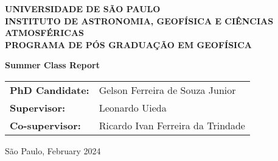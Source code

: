 \begin{titlepage}
   \begin{center}
        \vspace*{0.5cm}
        \small{\textbf{UNIVERSIDADE DE SÃO PAULO\\INSTITUTO DE ASTRONOMIA, GEOFÍSICA E CIÊNCIAS ATMOSFÉRICAS\\PROGRAMA DE PÓS GRADUAÇÃO EM GEOFÍSICA}}
        
        \vfill
        \large{\textbf{Summer Class Report}}
            
        \vfill
        \normalsize{
     
        \begin{center}
        \begin{tabular}{l l}
            \textbf{PhD Candidate:} & Gelson Ferreira de Souza Junior\\
            \textbf{Supervisor:}  & Leonardo Uieda\\
            \textbf{Co-supervisor:} &  Ricardo Ivan Ferreira da Trindade\\
        \end{tabular}
        \end{center}

        
        }
        
        \vfill
        \normalsize{São Paulo, February 2024}
            
   \end{center}
\end{titlepage}
